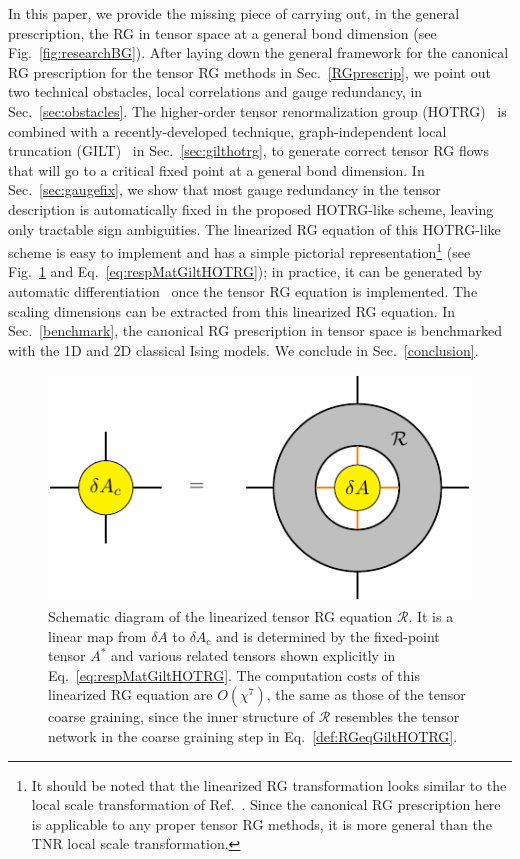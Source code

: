 \documentclass[aps,prr,reprint,superscriptaddress,nofootinbib,floatfix]{revtex4-2}
\begin{document}
In this paper, we provide the missing piece of carrying out, in the general prescription, the RG in tensor space at a general bond dimension (see Fig.~\ref{fig:researchBG}).
After laying down the general framework for the canonical RG prescription for the tensor RG methods in Sec.~\ref{RGprescrip}, we point out two technical obstacles, local correlations and gauge redundancy, in Sec.~\ref{sec:obstacles}.
The higher-order tensor renormalization group (HOTRG)~\cite{hotrg} is combined with a recently-developed technique, graph-independent local truncation (GILT)~\cite{gilts} in Sec.~\ref{sec:gilthotrg}, to generate correct tensor RG flows that will go to a critical fixed point at a general bond dimension. 
In Sec.~\ref{sec:gaugefix}, we show that most gauge redundancy in the tensor description is automatically fixed in the proposed HOTRG-like scheme, leaving only tractable sign ambiguities.
The linearized RG equation of this HOTRG-like scheme is easy to implement and has a simple pictorial representation\footnote{It should be noted that the linearized RG transformation looks similar to the local scale transformation of Ref.~\cite{EvenblyDilatationOp}.
        Since the canonical RG prescription here is applicable to any proper tensor RG methods, it is more general than the TNR local scale transformation.
    }
(see Fig.~\ref{fig:linearedRGschem} and Eq.~\eqref{eq:respMatGiltHOTRG}); in practice, it can be generated by automatic differentiation~\cite{xiang2019adtrg} once the tensor RG equation is implemented.
The scaling dimensions can be extracted from this linearized RG equation.
In Sec.~\ref{benchmark}, the canonical RG prescription in tensor space is benchmarked with the 1D and 2D classical Ising models.
We conclude in Sec.~\ref{conclusion}.
%
\begin{figure}[tb]
    \includegraphics[scale=0.9,valign=c]{linearedRGschem.pdf}
    \caption{\label{fig:linearedRGschem}
        Schematic diagram of the linearized tensor RG equation $\mathcal{R}$. 
        It is a linear map from $\delta A$ to $\delta A_c$ and is determined by the fixed-point tensor $A^*$ and various related tensors shown explicitly in Eq.~\eqref{eq:respMatGiltHOTRG}.
        The computation costs of this linearized RG equation are $O(\chi^7)$, the same as those of the tensor coarse graining, since the inner structure of $\mathcal{R}$ resembles the tensor network in the coarse graining step in Eq.~\eqref{def:RGeqGiltHOTRG}.
    }
\end{figure}
\end{document}
